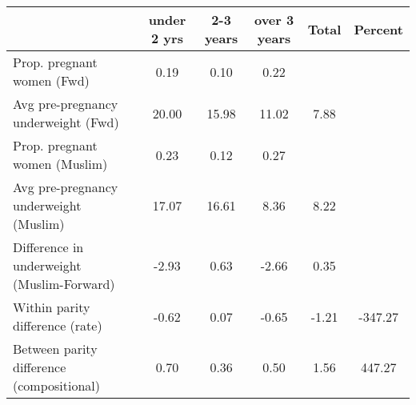 \begin{tabular}{l*{5}{c}}
\toprule
            &\multicolumn{1}{c}{under 2 yrs}&\multicolumn{1}{c}{2-3 years}&\multicolumn{1}{c}{over 3 years}&\multicolumn{1}{c}{Total}&\multicolumn{1}{c}{Percent}\\
\midrule
\midrule
Prop. pregnant women (Fwd)&        0.19&        0.10&        0.22&            &            \\
Avg pre-pregnancy underweight (Fwd)&       20.00&       15.98&       11.02&        7.88&            \\
Prop. pregnant women (Muslim)&        0.23&        0.12&        0.27&            &            \\
Avg pre-pregnancy underweight (Muslim)&       17.07&       16.61&        8.36&        8.22&            \\
Difference in underweight (Muslim-Forward)&       -2.93&        0.63&       -2.66&        0.35&            \\
Within parity difference (rate)&       -0.62&        0.07&       -0.65&       -1.21&     -347.27\\
Between parity difference (compositional)&        0.70&        0.36&        0.50&        1.56&      447.27\\
\bottomrule
\end{tabular}
